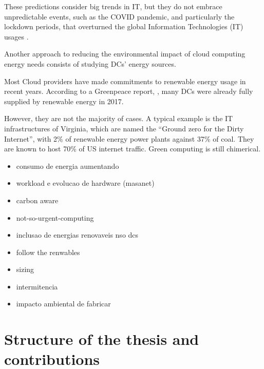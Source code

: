 






These predictions consider big trends in IT, but they do not embrace
unpredictable events, such as the COVID pandemic, and particularly the
lockdown periods, that overturned the global Information Technologies
(IT) usages \cite{feldmann2021implications}.

Another approach to reducing the environmental impact of cloud
computing energy needs consists of studying DCs' energy sources.

Most Cloud providers have made commitments to renewable energy usage in
recent years. According to a Greenpeace report, \cite{greenpeace2017},
many DCs were already fully supplied by renewable energy in
2017.


However, they are not the majority of cases. A typical example
is the IT infrastructures of Virginia, which are named the ``Ground
zero for the Dirty Internet'', with 2\% of renewable energy power
plants against 37\% of coal. They are known to host 70\% of US
internet traffic. Green computing is still chimerical.



\begin{itemize}
  
   \item consumo de energia aumentando
   \item workload e evolucao de hardware (masanet)
   \item carbon aware
   \item not-so-urgent-computing
   \item inclusao de energias renovaveis nso dcs
   \item follow the renwables
   \item sizing
   \item intermitencia
   \item impacto ambiental de fabricar

\end{itemize}

\section{Structure of the thesis and contributions}


